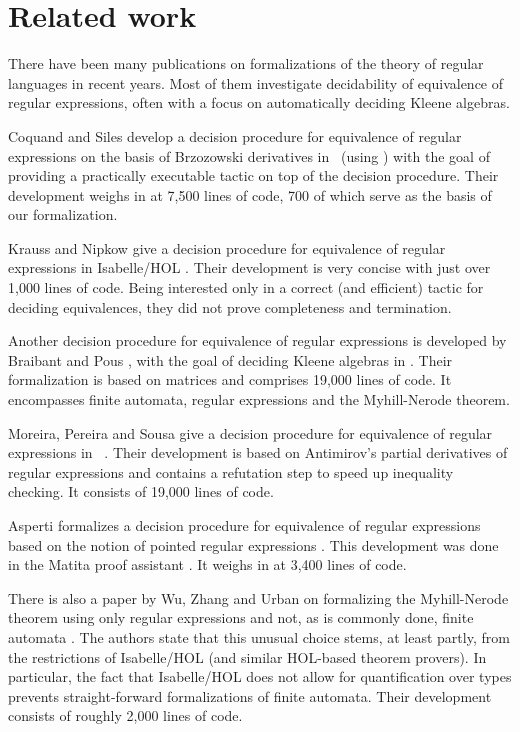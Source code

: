 \section{Related work}

There have been many publications on formalizations of the theory of regular languages in recent years.
Most of them investigate decidability of equivalence of regular expressions, often with a focus on automatically deciding Kleene algebras.


Coquand and Siles develop a decision procedure for equivalence of regular expressions \cite{DBLP:conf/cpp/CoquandS11} on the basis of Brzozowski derivatives \cite{DBLP:journals/jacm/Brzozowski64} in \coq\ (using \ssreflect) with the goal of providing a practically executable tactic on top of the decision procedure. 
Their development weighs in at 7,500 lines of code, 700 of which serve as the basis of our formalization.


Krauss and Nipkow give a decision procedure for equivalence of regular expressions in Isabelle/HOL \cite{DBLP:journals/jar/KraussN12}. 
Their development is very concise with just over 1,000 lines of code. 
Being interested only in a correct (and efficient) tactic for deciding equivalences, they did not prove completeness and termination. 


Another decision procedure for equivalence of regular expressions is developed by Braibant and Pous \cite{DBLP:journals/corr/abs-1105-4537}, with the goal of deciding Kleene algebras in \coq. Their formalization is based on matrices and comprises 19,000 lines of code. It encompasses finite automata, regular expressions and the Myhill-Nerode theorem.


Moreira, Pereira and Sousa give a decision procedure for equivalence of regular expressions in \coq\ \cite{DBLP:conf/RelMiCS/MoreiraPS12}.
Their development is based on Antimirov's partial derivatives of regular expressions \cite{DBLP:journals/tcs/Antimirov96} and contains a refutation step to speed up inequality checking. It consists of 19,000 lines of code.


Asperti formalizes a decision procedure for equivalence of regular expressions \cite{DBLP:conf/itp/Asperti12} based on the notion of pointed regular expressions \cite{DBLP:journals/corr/abs-1010-2604}. This development was done in the Matita proof assistant \cite{DBLP:conf/cade/AspertiRCT11}. It weighs in at 3,400 lines of code.


There is also a paper by Wu, Zhang and Urban on formalizing the Myhill-Nerode theorem using only regular expressions and not, as is commonly done, finite automata \cite{DBLP:conf/itp/WuZU11}.
The authors state that this unusual choice stems, at least partly, from the restrictions of Isabelle/HOL (and similar HOL-based theorem provers). 
In particular, the fact that Isabelle/HOL does not allow for quantification over types prevents straight-forward formalizations of finite automata.
Their development consists of roughly 2,000 lines of code.


